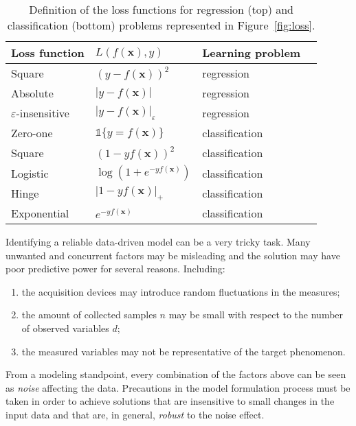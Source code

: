	  \begin{table}[!h]
	  	\centering
	  	\caption{Definition of the loss functions for regression (top) and classification (bottom) problems represented in Figure~\ref{fig:loss}.}\label{tab:losses}
	  	\begin{tabular}{@{}ll@{}ll@{}}
	  		\toprule
	  		Loss function & $L(f(\bm{x}),y)$  & Learning problem           \\ \midrule
	  		Square                   & $(y - f(\bm{x}))^2$ & regression \\
	  		Absolute                 & $|y - f(\bm{x})|$ & regression   \\
	  		$\varepsilon$-insensitive   & $|y - f(\bm{x})|_\varepsilon$  & regression                 \\
	  		\midrule
	  		Zero-one               & $\mathds{1}\{y=f(\bm{x})\}$ & classification \\
	  		Square                 & $(1 - yf(\bm{x}))^2$ & classification  \\
	  		Logistic                 & $\log(1 + e^{-yf(\bm{x})})$ & classification  \\
	  		Hinge                 & $|1 - yf(\bm{x})|_+$ & classification  \\
	  		Exponential & $e^{- yf(\bm{x})}$ & classification \\
	  		\bottomrule
	  	\end{tabular}
	  \end{table}

	  Identifying a reliable data-driven model can be a very tricky task. Many unwanted and concurrent factors may be misleading and the solution may have poor predictive power for several reasons.
		Including:
		\begin{enumerate}
			\item the acquisition devices may introduce random fluctuations in the measures;
			\item the amount of collected samples $n$ may be small with respect to the number of observed variables $d$;
			\item the measured variables may not be representative of the target phenomenon.
	  \end{enumerate}
		From a modeling standpoint, every combination of the factors above can be seen as \textit{noise} affecting the data.
		Precautions in the model formulation process must be taken in order to achieve solutions that are insensitive to small changes in the input data and that are, in general, \textit{robust} to the noise effect.


